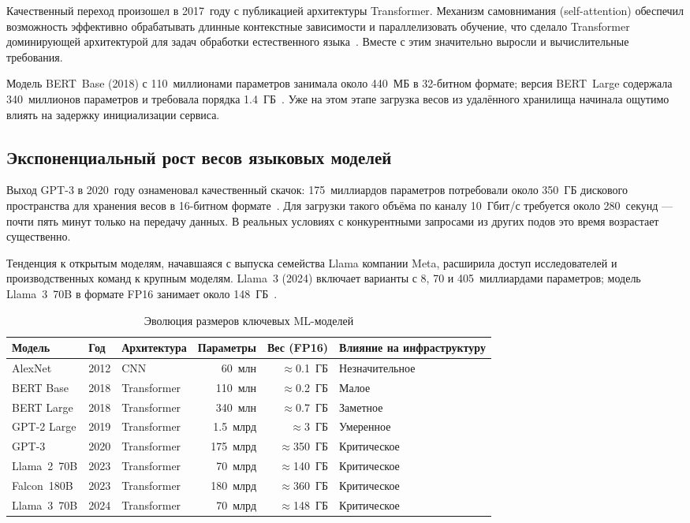 Качественный переход произошел в 2017~году с публикацией архитектуры Transformer. Механизм самовнимания (self-attention) обеспечил возможность эффективно обрабатывать длинные контекстные зависимости и параллелизовать обучение, что сделало Transformer доминирующей архитектурой для задач обработки естественного языка~\cite{bert2018}. Вместе с этим значительно выросли и вычислительные требования.

Модель BERT~Base (2018) с 110~миллионами параметров занимала около 440~МБ в 32-битном формате; версия BERT~Large содержала 340~миллионов параметров и требовала порядка 1.4~ГБ~\cite{bert2018}. Уже на этом этапе загрузка весов из удалённого хранилища начинала ощутимо влиять на задержку инициализации сервиса.

\subsection{Экспоненциальный рост весов языковых моделей}

Выход GPT-3 в 2020~году ознаменовал качественный скачок: 175~миллиардов параметров потребовали около 350~ГБ дискового пространства для хранения весов в 16-битном формате~\cite{gpt3_2020}. Для загрузки такого объёма по каналу 10~Гбит/с требуется около 280~секунд — почти пять минут только на передачу данных. В реальных условиях с конкурентными запросами из других подов это время возрастает существенно.

Тенденция к открытым моделям, начавшаяся с выпуска семейства Llama компании Meta, расширила доступ исследователей и производственных команд к крупным моделям. Llama~3 (2024) включает варианты с 8, 70 и 405~миллиардами параметров; модель Llama~3~70B в формате FP16 занимает около 148~ГБ~\cite{llamapaper2024}.

\begin{table}[htbp]
\centering
\caption{Эволюция размеров ключевых ML-моделей}
\label{tab:model_sizes}
\begin{tabular}{lllrrl}
\toprule
Модель & Год & Архитектура & Параметры & Вес (FP16) & Влияние на инфраструктуру \\
\midrule
AlexNet       & 2012 & CNN         & 60~млн    & $\approx$0.1~ГБ & Незначительное \\
BERT Base     & 2018 & Transformer & 110~млн   & $\approx$0.2~ГБ & Малое \\
BERT Large    & 2018 & Transformer & 340~млн   & $\approx$0.7~ГБ & Заметное \\
GPT-2 Large   & 2019 & Transformer & 1.5~млрд  & $\approx$3~ГБ   & Умеренное \\
GPT-3         & 2020 & Transformer & 175~млрд  & $\approx$350~ГБ & Критическое \\
Llama~2~70B   & 2023 & Transformer & 70~млрд   & $\approx$140~ГБ & Критическое \\
Falcon~180B   & 2023 & Transformer & 180~млрд  & $\approx$360~ГБ & Критическое \\
Llama~3~70B   & 2024 & Transformer & 70~млрд   & $\approx$148~ГБ & Критическое \\
\bottomrule
\end{tabular}
\end{table}

